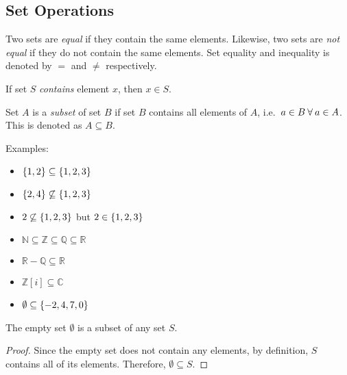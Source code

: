 \subsection{Set Operations}
\begin{definition}
    Two sets are \emph{equal} if they contain the same elements. Likewise, two sets are \emph{not equal} 
    if they do not contain the same elements. Set equality and inequality is denoted by \(=\) and \(\ne\) respectively.   
\end{definition}

\bigskip
\begin{definition}
    If set \(S\) \emph{contains} element \(x\), then \(x\in S\). 
\end{definition}

\bigskip
\begin{definition}
    Set \(A\) is a \emph{subset} of set \(B\) if set \(B\) contains all elements of \(A\), i.e.\ \newline\(a\in B\:\forall\: a\in A\).
    This is denoted as \(A\subseteq B\).
\end{definition}

Examples:
\begin{itemize}
    \item \(\{1,2\}\subseteq\{1,2,3\}\)
    \item \(\{2,4\}\not\subseteq\{1,2,3\}\)
    \item \(2\not\subseteq\{1,2,3\}\) but \(2\in\{1,2,3\}\)
    \item \(\mathbb{N}\subseteq\mathbb{Z}\subseteq\mathbb{Q}\subseteq\mathbb{R}\)
    \item \(\mathbb{R}-\mathbb{Q}\subseteq\mathbb{R}\)
    \item \(\mathbb{Z}[i]\subseteq\mathbb{C}\)
    \item \(\emptyset\subseteq\{-2,4,7,0\}\)
\end{itemize}

\bigskip
\begin{proposition}
    The empty set \(\emptyset\) is a subset of any set \(S\).
\end{proposition}
\begin{proof}
    Since the empty set does not contain any elements, by definition, \(S\) contains all of its elements. Therefore, \(\emptyset\subseteq S\).
\end{proof}

